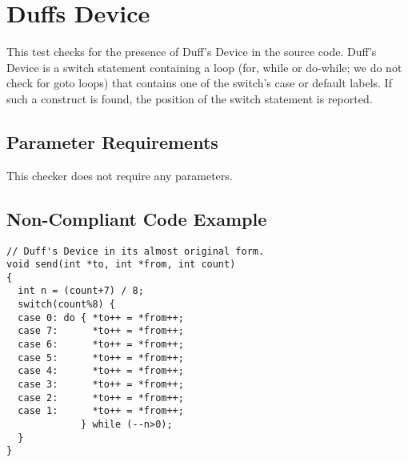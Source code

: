 %
%

\section{Duffs Device}
\label{DuffsDevice::overview}

This test checks for the presence of Duff's Device in the source code. Duff's
Device is a switch statement containing a loop (for, while or do-while; we do
not check for goto loops) that contains one of the switch's case or default
labels. If such a construct is found, the position of the switch statement is
reported.

\subsection{Parameter Requirements}

This checker does not require any parameters.

\subsection{Non-Compliant Code Example}

\begin{verbatim}
// Duff's Device in its almost original form.
void send(int *to, int *from, int count)
{
  int n = (count+7) / 8;
  switch(count%8) {
  case 0: do { *to++ = *from++;
  case 7:      *to++ = *from++;
  case 6:      *to++ = *from++;
  case 5:      *to++ = *from++;
  case 4:      *to++ = *from++;
  case 3:      *to++ = *from++;
  case 2:      *to++ = *from++;
  case 1:      *to++ = *from++;
             } while (--n>0);
  }
}
\end{verbatim}

